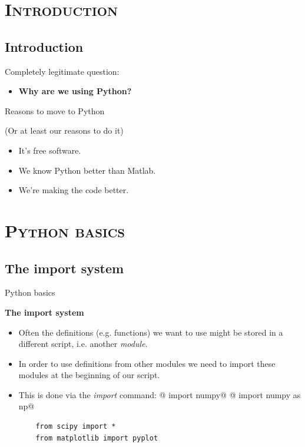 \documentclass[xcolor=x11names, compress]{beamer}
\renewcommand{\(}{\begin{columns}}
\renewcommand{\)}{\end{columns}}
\newcommand{\<}[1]{\begin{column}{#1}}
\renewcommand{\>}{\end{column}}
\begin{document}
\section{ \scshape Introduction}
\subsection{Introduction}
\begin{frame}{}
\large

Completely legitimate question:

\vfill
\pause

\begin{itemize}
  \item \textbf{\Large Why are we using Python?}
\end{itemize}

\vfill

\end{frame}

\begin{frame}{Reasons to move to Python}

  (Or at least our reasons to do it)

  \begin{itemize}
    \Large
    \newcommand{\myitem}{\vfill \pause \item[{\color{darkgreen}\checkmark}]}
    \myitem It's free software.
    \myitem We know Python better than Matlab.
    \myitem We're making the code better.
  \end{itemize}

\end{frame}


\section{\scshape Python basics}
\subsection{The import system}
\begin{frame}[fragile]{Python basics}

\textbf{The import system}

\begin{itemize}
	\item Often the definitions (e.g. functions) we want to use might be stored in a different script, i.e. another \textit{module}.
	\item In order to use definitions from other modules we need to import these modules at the beginning of our script.
	\item This is done via the \textit{import} command: 
  @    import numpy@
  @    import numpy as np@
  \begin{verbatim}
    from scipy import *
    from matplotlib import pyplot
  \end{verbatim}
\end{itemize}

\end{frame}
\end{document}
